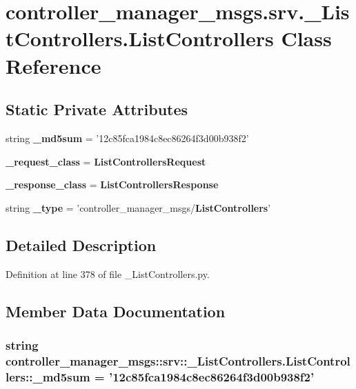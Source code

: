 \section{controller\-\_\-manager\-\_\-msgs.\-srv.\-\_\-\-List\-Controllers.\-List\-Controllers \-Class \-Reference}
\label{classcontroller__manager__msgs_1_1srv_1_1__ListControllers_1_1ListControllers}
\subsection*{\-Static \-Private \-Attributes}
\begin{DoxyCompactItemize}
\item 
string {\bf \-\_\-md5sum} = '12c85fca1984c8ec86264f3d00b938f2'
\item 
{\bf \-\_\-request\-\_\-class} = {\bf \-List\-Controllers\-Request}
\item 
{\bf \-\_\-response\-\_\-class} = {\bf \-List\-Controllers\-Response}
\item 
string {\bf \-\_\-type} = 'controller\-\_\-manager\-\_\-msgs/{\bf \-List\-Controllers}'
\end{DoxyCompactItemize}


\subsection{\-Detailed \-Description}


\-Definition at line 378 of file \-\_\-\-List\-Controllers.\-py.



\subsection{\-Member \-Data \-Documentation}
\subsubsection[{\-\_\-md5sum}]{\setlength{\rightskip}{0pt plus 5cm}string {\bf controller\-\_\-manager\-\_\-msgs\-::srv\-::\-\_\-\-List\-Controllers.\-List\-Controllers\-::\-\_\-md5sum} = '12c85fca1984c8ec86264f3d00b938f2'\hspace{0.3cm}{\ttfamily  [static, private]}}\label{classcontroller__manager__msgs_1_1srv_1_1__ListControllers_1_1ListControllers_a75b5a27df717e91937f30ef46e273153}


